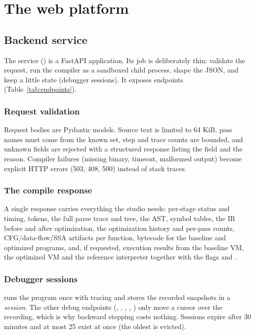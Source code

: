 \chapter{The web platform}
\label{ch:platform}

\section{Backend service}
The service () is a FastAPI application. Its job is deliberately thin: validate the request, run the compiler as a sandboxed child process, shape the JSON, and keep a little state (debugger sessions). It exposes \NumEndpoints{} endpoints (Table~\ref{tab:endpoints}).

\begingroup\small

\endgroup
{}\label{tab:endpoints}

\subsection{Request validation}
Request bodies are Pydantic models. Source text is limited to 64 KiB, pass names must come from the known set, step and trace counts are bounded, and unknown fields are rejected with a structured  response listing the field and the reason. Compiler failures (missing binary, timeout, malformed output) become explicit HTTP errors (503, 408, 500) instead of stack traces.

\subsection{The compile response}
A single  response carries everything the studio needs: per-stage status and timing, tokens, the full parse trace and tree, the AST, symbol tables, the IR before and after optimization, the optimization history and per-pass counts, CFG/data-flow/SSA artifacts per function, bytecode for the baseline and optimized programs, and, if requested, execution results from the baseline VM, the optimized VM and the reference interpreter together with the flags  and .

\subsection{Debugger sessions}
 runs the program once with tracing and stores the recorded snapshots in a \emph{session}. The other debug endpoints (, , , , ) only move a cursor over the recording, which is why backward stepping costs nothing. Sessions expire after 30 minutes and at most 25 exist at once (the oldest is evicted).

